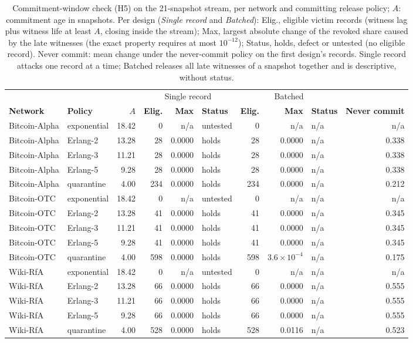 \begin{table}[!t]
\centering
\scriptsize
\setlength{\tabcolsep}{3pt}
\caption{Commitment-window check (H5) on the 21-snapshot stream, per network and committing release policy; $A$: commitment age in snapshots. Per design (\emph{Single record} and \emph{Batched}): Elig., eligible victim records (witness lag plus witness life at least $A$, closing inside the stream); Max, largest absolute change of the revoked share caused by the late witnesses (the exact property requires at most $10^{-12}$); Status, holds, defect or untested (no eligible record). Never commit: mean change under the never-commit policy on the first design's records. Single record attacks one record at a time; Batched releases all late witnesses of a snapshot together and is descriptive, without status.}
\label{tab:s_s_window_21}
\begin{tabular}{@{}llrrrlrrlr@{}}
\toprule
 & & & \multicolumn{3}{c}{Single record} & \multicolumn{3}{c}{Batched} & \\
\cmidrule(lr){4-6}\cmidrule(lr){7-9}
\textbf{Network} & \textbf{Policy} & \textbf{$A$} & \textbf{Elig.} & \textbf{Max} & \textbf{Status} & \textbf{Elig.} & \textbf{Max} & \textbf{Status} & \textbf{Never commit} \\
\midrule
Bitcoin-Alpha & exponential & 18.42 & 0 & n/a & untested & 0 & n/a & n/a & n/a \\
Bitcoin-Alpha & Erlang-2 & 13.28 & 28 & 0.0000 & holds & 28 & 0.0000 & n/a & 0.338 \\
Bitcoin-Alpha & Erlang-3 & 11.21 & 28 & 0.0000 & holds & 28 & 0.0000 & n/a & 0.338 \\
Bitcoin-Alpha & Erlang-5 & 9.28 & 28 & 0.0000 & holds & 28 & 0.0000 & n/a & 0.338 \\
Bitcoin-Alpha & quarantine & 4.00 & 234 & 0.0000 & holds & 234 & 0.0000 & n/a & 0.212 \\
Bitcoin-OTC & exponential & 18.42 & 0 & n/a & untested & 0 & n/a & n/a & n/a \\
Bitcoin-OTC & Erlang-2 & 13.28 & 41 & 0.0000 & holds & 41 & 0.0000 & n/a & 0.345 \\
Bitcoin-OTC & Erlang-3 & 11.21 & 41 & 0.0000 & holds & 41 & 0.0000 & n/a & 0.345 \\
Bitcoin-OTC & Erlang-5 & 9.28 & 41 & 0.0000 & holds & 41 & 0.0000 & n/a & 0.345 \\
Bitcoin-OTC & quarantine & 4.00 & 598 & 0.0000 & holds & 598 & $3.6\times10^{-4}$ & n/a & 0.175 \\
Wiki-RfA & exponential & 18.42 & 0 & n/a & untested & 0 & n/a & n/a & n/a \\
Wiki-RfA & Erlang-2 & 13.28 & 66 & 0.0000 & holds & 66 & 0.0000 & n/a & 0.555 \\
Wiki-RfA & Erlang-3 & 11.21 & 66 & 0.0000 & holds & 66 & 0.0000 & n/a & 0.555 \\
Wiki-RfA & Erlang-5 & 9.28 & 66 & 0.0000 & holds & 66 & 0.0000 & n/a & 0.555 \\
Wiki-RfA & quarantine & 4.00 & 528 & 0.0000 & holds & 528 & 0.0116 & n/a & 0.523 \\
\bottomrule
\end{tabular}
\end{table}

